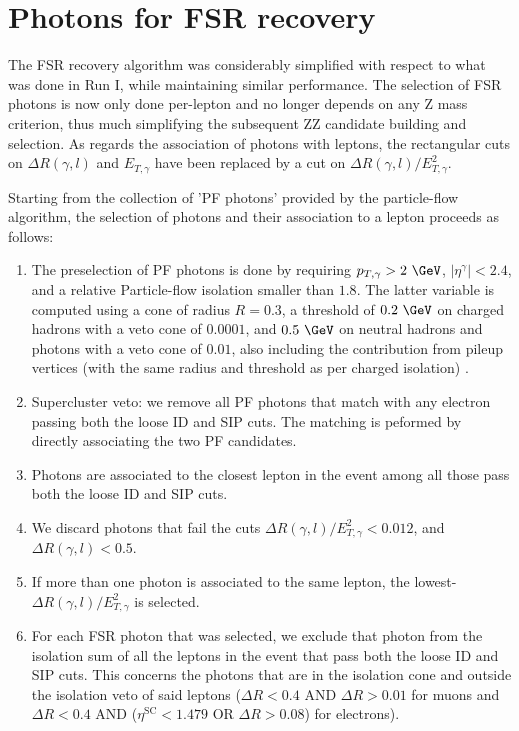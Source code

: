 \section{Photons for FSR recovery}
\label{sec:FSRphotons}

The FSR recovery algorithm was considerably simplified with respect to what was done in Run I, while maintaining similar performance. 
The selection of FSR photons is now only done per-lepton and no longer depends on any Z mass criterion, thus much simplifying the subsequent ZZ candidate building and selection. As regards the association of photons with leptons, the rectangular cuts on $\Delta R(\gamma,l)$ and $E_{T,\gamma}$  have been replaced by a cut on $\Delta R(\gamma,l)/E_{T,\gamma}^{2}$.

Starting from the collection of 'PF photons' provided by the particle-flow algorithm, the selection of photons and their association to a lepton proceeds as follows:
\begin{enumerate}
\item The preselection of PF photons is done by requiring $p_{T,\gamma} > 2~\GeV$, $|\eta^{\gamma}| < 2.4$, and a relative Particle-flow isolation smaller than $1.8$. The latter variable is computed using a cone of radius $R=0.3$, a threshold of $0.2~\GeV$ on charged hadrons with a veto cone of $0.0001$, and $0.5~\GeV$ on neutral hadrons and photons with a veto cone of $0.01$, also including the contribution from pileup vertices (with the same radius and threshold as per charged isolation) .
\item Supercluster veto: we remove all PF photons that match with any electron passing both the loose ID and SIP cuts. The matching is peformed by directly associating the two PF candidates.
\item Photons are associated to the closest lepton in the event among all those pass both the loose ID and SIP cuts.
\item We discard photons that fail the cuts $\Delta R(\gamma,l)/E_{T,\gamma}^2 < 0.012$, and $\Delta R(\gamma,l)<0.5$.
\item If more than one photon is associated to the same lepton, the lowest-$\Delta R(\gamma,l)/E_{T,\gamma}^2$ is selected.
\item For each FSR photon that was selected, we exclude that photon from the isolation sum of all the leptons in the event that pass both the loose ID and SIP cuts. This concerns the photons that are in the isolation cone and outside the isolation veto of said leptons ($\Delta R < 0.4$ AND $\Delta R > 0.01$ for muons and $\Delta R < 0.4$ AND ($\eta^{\text{SC}} < 1.479$ OR $\Delta R > 0.08$) for electrons).
\end{enumerate}

